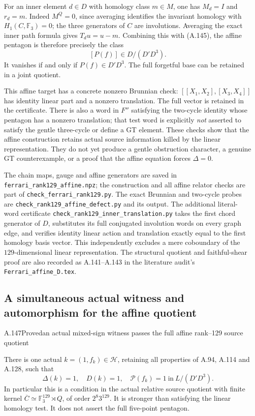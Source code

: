 For an inner element $d\in D$ with homology class $m\in M$,
one has $M_d=I$ and $r_d=m$. Indeed $M^Q=0$, since averaging
identifies the invariant homology with $H_1(C,\mathbb F_3)=0$;
the three generators of $C$ are involutions. Averaging the
exact inner path formula gives $T_du=u-m$.
Combining this with (A.145), the affine pentagon is therefore
precisely the class
\[
                    [P(f)]\in D/(D'D^3).
 \tag{FP.50.4}
\]
It vanishes if and only if $P(f)\in D'D^3$.
The full forgetful base can be retained in a joint quotient.

This affine target has a concrete nonzero Brunnian check:
$[[X_1,X_2],[X_3,X_4]]$ has identity linear part and a
nonzero translation. The full vector is retained in the
certificate. There is also a word in $F''$ satisfying the
two-cycle identity whose pentagon has a nonzero translation;
that test word is explicitly \emph{not} asserted to satisfy
the gentle three-cycle or define a GT element. These checks
show that the affine construction retains actual source
information killed by the linear representation. They do
not yet produce a gentle obstruction character, a genuine
GT counterexample, or a proof that the affine equation
forces $\Delta=0$.

The chain maps, gauge and affine generators are saved in
\texttt{ferrari\_rank129\_affine.npz}; the construction and
all affine relator checks are part of
\texttt{check\_ferrari\_rank129.py}. The exact Brunnian and
two-cycle probes are
\texttt{check\_rank129\_affine\_defect.py} and its output.
The additional literal-word certificate
\texttt{check\_rank129\_inner\_translation.py} takes the
first chord generator of $D$, substitutes its full conjugated
involution words on every graph edge, and verifies identity
linear action and translation exactly equal to the first
homology basis vector. This independently excludes a mere
coboundary of the $129$-dimensional linear representation.
The structural quotient and faithful-shear proof are also
recorded as A.141--A.143 in the literature audit's
\texttt{Ferrari\_affine\_D.tex}.

\subsection{A simultaneous actual witness and automorphism for the affine quotient}


\begin{statement}{A.147}{Proved}{an actual mixed-sign witness passes the full affine rank--129 source quotient}
\end{statement}
There is one actual $k=(1,f_k)\in\mathcal H$, retaining all
properties of A.94, A.114 and A.128, such that
\[
 \boxed{\quad \Delta(k)=1,\quad D(k)=1,\quad
  \mathcal P(f_k)=1\ \text{in}\
  L/(D'D^3).\quad}
\]
In particular this is a condition in the actual relative source
quotient with finite kernel
$\overline C\simeq\mathbb F_3^{129}\rtimes Q$, of order
$2^8 3^{129}$.  It is stronger than satisfying the linear
homology test.  It does not assert the full five-point pentagon.


